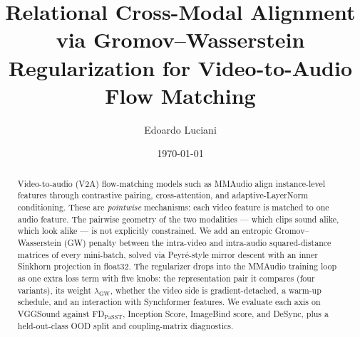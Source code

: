 \documentclass[11pt,a4paper]{article}
\title{Relational Cross-Modal Alignment via Gromov--Wasserstein\\
  Regularization for Video-to-Audio Flow Matching}
\author{Edoardo Luciani}
\date{\today}
\begin{document}
\maketitle
\begin{abstract}
Video-to-audio (V2A) flow-matching models such as MMAudio align
instance-level features through contrastive pairing, cross-attention,
and adaptive-LayerNorm conditioning. These are \emph{pointwise}
mechanisms: each video feature is matched to one audio feature.
The pairwise geometry of the two modalities --- which clips sound
alike, which look alike --- is not explicitly constrained. We add
an entropic Gromov--Wasserstein (GW) penalty between the
intra-video and intra-audio squared-distance matrices of every
mini-batch, solved via Peyr\'e-style mirror descent with an inner
Sinkhorn projection in float32. The regularizer drops into the
MMAudio training loop as one extra loss term with five knobs: the
representation pair it compares (four variants), its weight
$\lambda_{\mathrm{GW}}$, whether the video side is
gradient-detached, a warm-up schedule, and an interaction with
Synchformer features. We evaluate each axis on VGGSound against
FD$_{\text{PaSST}}$, Inception Score, ImageBind score, and DeSync,
plus a held-out-class OOD split and coupling-matrix diagnostics.
\end{abstract}

\tableofcontents











\end{document}
